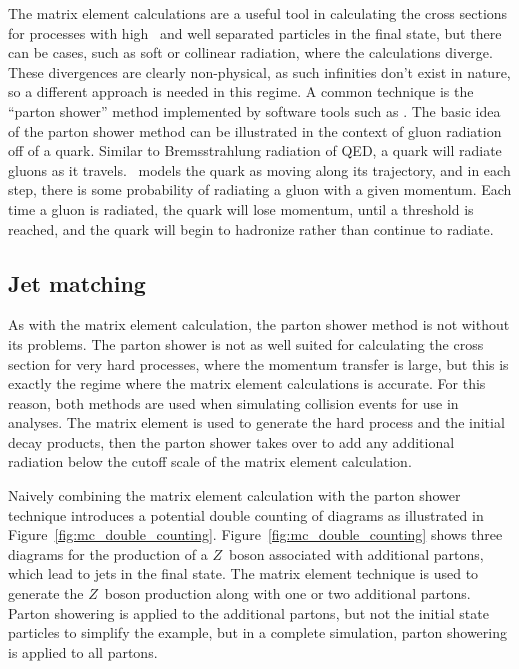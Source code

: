 The matrix element calculations are a useful tool in calculating the cross
sections for processes with high \pt\ and well separated particles in the
final state,
but there can be cases, such as soft or collinear radiation, where the
calculations diverge.
These divergences are clearly non-physical, as such infinities don't exist in
nature, so a different approach is needed in this regime.
A common technique is the ``parton shower'' method implemented by software
tools such as \pythia.
The basic idea of the parton shower method can be illustrated in the context of
gluon radiation off of a quark.
Similar to Bremsstrahlung radiation of QED, a quark will radiate gluons as it
travels.
\pythia\ models the quark as moving along its trajectory, and in each step,
there is some probability of radiating a gluon with a given momentum.
Each time a gluon is radiated, the quark will lose momentum, until a
threshold is reached, and the quark will begin to hadronize rather than
continue to radiate.

\FloatBarrier
\subsection{Jet matching}
\label{sec:jet_matching}

As with the matrix element calculation, the parton shower method is not without
its problems.
The parton shower is not as well suited for calculating the cross section
for very hard processes, where the momentum transfer is large, but this is
exactly the regime where the matrix element calculations is accurate.
For this reason, both methods are used when simulating collision events for
use in analyses.
The matrix element is used to generate the hard process and the initial decay
products, then the parton shower takes over to add any additional radiation
below the cutoff scale of the matrix element calculation.

Naively combining the matrix element calculation with the parton shower
technique introduces a potential double counting of diagrams as illustrated in
Figure~\ref{fig:mc_double_counting}.
Figure~\ref{fig:mc_double_counting} shows three diagrams for the production
of a $Z$~boson associated with additional partons, which lead to jets in the
final state.
The matrix element technique is used to generate the $Z$~boson
production along with one or two additional partons.
Parton showering is applied to the additional partons, but not the initial
state particles to simplify the example, but in a complete simulation, parton
showering is applied to all partons.

